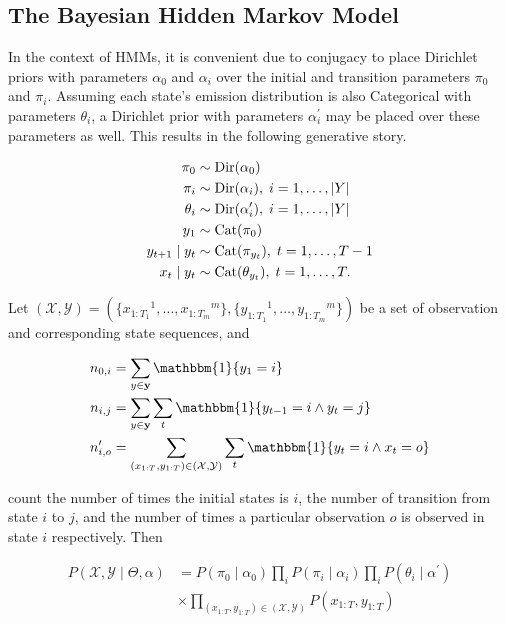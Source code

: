 \documentclass[12pt]{report}
\newcommand{\p}[0]{\prime}
\newcommand{\1}[0]{\mathbbm{1}}
\newcommand{\Cat}[0]{\textnormal{Cat}}
\newcommand{\Dir}[0]{\textnormal{Dir}}
\newcommand{\seq}[3]{\ensuremath{#1_{{#2}:{#3}}}}
\DeclarePairedDelimiter\abs{\lvert}{\rvert}%
\begin{document}
\subsection{The Bayesian Hidden Markov Model}
In the context of \acp{HMM}, it is convenient due to conjugacy to place Dirichlet priors
with parameters $\alpha_0$ and $\alpha_i$ over the initial and transition 
parameters $\pi_0$ and $\pi_i$. Assuming each state's emission distribution is also Categorical 
with parameters $\theta_i$, a Dirichlet prior with parameters $\alpha_i^\p$ may be placed 
over these parameters as well. This results in the following generative story.

\begin{align*}
    \pi_0 & \sim \Dir(\alpha_0) \\
    \pi_i & \sim \Dir(\alpha_i),\; i = 1, \ldots, \abs{Y} \\
    \theta_i & \sim \Dir(\alpha_i^\p),\; i = 1, \ldots, \abs{Y} \\ 
    y_1 & \sim \Cat(\pi_0) \\
    y_{t+1} \mid y_t & \sim \Cat(\pi_{y_t}),\; t = 1, \ldots, T-1 \\
    x_t \mid y_t & \sim \Cat(\theta_{y_t}), \; t = 1, \ldots, T.
\end{align*}

Let $(\mathcal{X}, \mathcal{Y}) = (\{\seq{x}{1}{T_1}^1, \ldots, \seq{x}{1}{T_m}^m\},  
\{\seq{y}{1}{T_1}^1, \ldots, \seq{y}{1}{T_m}^m\})$ be a set of
observation and corresponding state sequences, and

\begin{align*}
    n_{0, i} &= \sum_{y \in \mathbf{y}} \1\{y_1 = i\} \\
    n_{i, j} &= \sum_{y \in \mathbf{y}} \sum_{t} \1\{y_{t-1} = i \wedge y_t = j\} \\
    n_{i, o}^\p &= \sum_{(\seq{x}{1}{T},\seq{y}{1}{T}) \in (\mathcal{X},\mathcal{Y})} \sum_{t} \1\{y_t = i \wedge x_t = o\} \\
\end{align*}

count the number of times the initial states is $i$, the number of transition from state $i$ to $j$,
and the number of times a particular observation $o$ is observed in state $i$ respectively. Then 

\begin{align}  \label{eq:bayes-hmm-joint-simple}
 P(\mathcal{X}, \mathcal{Y} \mid \Theta, \alpha) 
 &=  P(\pi_0 \mid \alpha_0) \prod_i P(\pi_i \mid \alpha_i) \prod_i P(\theta_i \mid \alpha^\prime) \nonumber\\
 & \times \prod_{(\seq{x}{1}{T},\seq{y}{1}{T}) \in (\mathcal{X},\mathcal{Y})} P(\seq{x}{1}{T},\seq{y}{1}{T})
\end{align}
\end{document}
